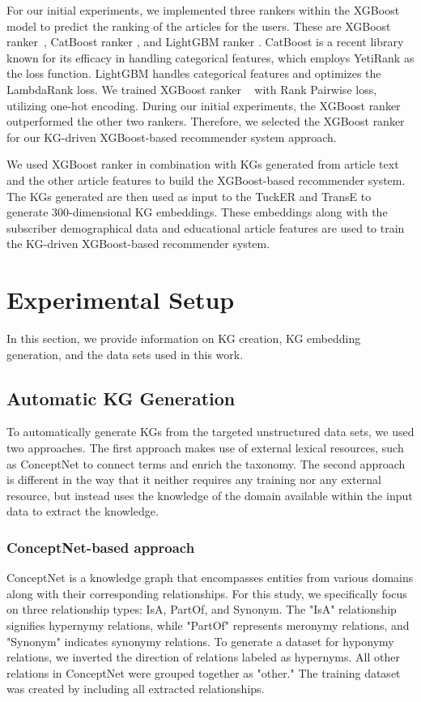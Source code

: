 \documentclass[11pt]{article}
\begin{document}
For our initial experiments, we implemented three rankers within the XGBoost model to predict the ranking of the articles for the users. These are XGBoost ranker~\cite{10.1145/2939672.2939785}, CatBoost ranker \cite{prokhorenkova2018catboost}, and LightGBM ranker \cite{ke2017lightgbm}. CatBoost \cite{prokhorenkova2018catboost} is a recent library known for its efficacy in handling categorical features, which employs YetiRank \cite{gulin2011winning} as the loss function. LightGBM \cite{ke2017lightgbm} handles categorical features and optimizes the LambdaRank loss. We trained XGBoost ranker ~\cite{10.1145/2939672.2939785} with Rank Pairwise loss, utilizing one-hot encoding. During our initial experiments, the XGBoost ranker outperformed the other two rankers. Therefore, we selected the XGBoost ranker for our KG-driven XGBoost-based recommender system approach. 


We used XGBoost ranker in combination with KGs generated from article text and the other article features to build the XGBoost-based recommender system. The KGs generated are then used as input to the TuckER and TransE to generate 300-dimensional KG embeddings. These embeddings along with the subscriber demographical data and educational article features are used to train the KG-driven XGBoost-based recommender system.  

\section{Experimental Setup} \label{sec_experimental_setup}

In this section, we provide information on KG creation, KG embedding generation, and the data sets used in this work.

\subsection{Automatic KG Generation}
To automatically generate KGs from the targeted unstructured data sets, we used two approaches. The first approach makes use of external lexical resources, such as ConceptNet \cite{speer2017conceptnet} to connect terms and enrich the taxonomy. The second approach is different in the way that it neither requires any training nor any external resource, but instead uses the knowledge of the domain available within the input data to extract the knowledge.

\subsubsection{ConceptNet-based approach} ConceptNet \cite{speer2017conceptnet} is a knowledge graph that encompasses entities from various domains along with their corresponding relationships. For this study, we specifically focus on three relationship types: IsA, PartOf, and Synonym. The "IsA" relationship signifies hypernymy relations, while "PartOf" represents meronymy relations, and "Synonym" indicates synonymy relations. To generate a dataset for hyponymy relations, we inverted the direction of relations labeled as hypernyms. All other relations in ConceptNet were grouped together as "other." The training dataset was created by including all extracted relationships.
\end{document}
